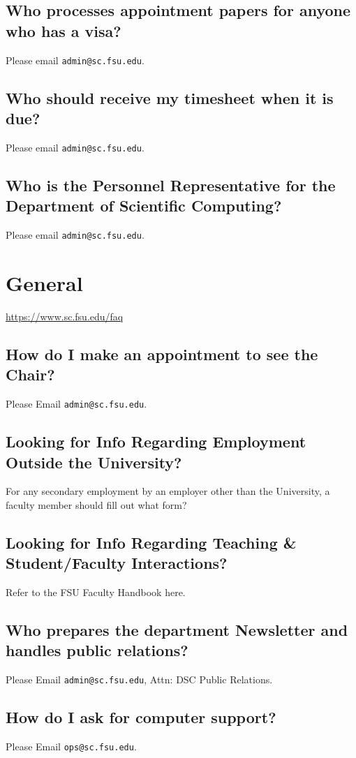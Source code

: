 \documentclass[12pt,a4paper]{article}
\begin{document}
\subsection{Who processes appointment papers for anyone who has a visa?}
Please email \texttt{admin@sc.fsu.edu}.

\subsection{Who should receive my timesheet when it is due?}
Please email \texttt{admin@sc.fsu.edu}.

\subsection{Who is the Personnel Representative for the Department of Scientific Computing?}
Please email \texttt{admin@sc.fsu.edu}.

\section{General}
\url{https://www.sc.fsu.edu/faq}
\subsection{How do I make an appointment to see the Chair?}
Please Email \texttt{admin@sc.fsu.edu}.

\subsection{Looking for Info Regarding Employment Outside the University?}
For any secondary employment by an employer other than the University, a faculty member should fill out what form?

\subsection{Looking for Info Regarding Teaching \& Student/Faculty Interactions?}
Refer to the FSU Faculty Handbook here.

\subsection{Who prepares the department Newsletter and handles public relations?}
Please Email \texttt{admin@sc.fsu.edu}, Attn: DSC Public Relations.

\subsection{How do I ask for computer support?}
Please Email \texttt{ops@sc.fsu.edu}.
\end{document}
